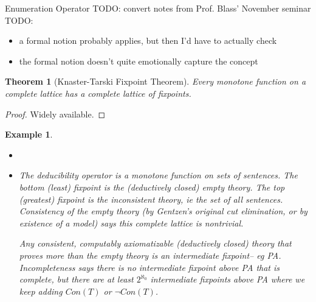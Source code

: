 \documentclass[
	fontsize=10pt, %
	twoside=false, %
	secnumdepth=-1, %
]{kaobook}
\theoremstyle{break}
\newtheorem*{thm}{Theorem} %
\newtheorem*{Ex}{Example} %
\begin{document}
    \See Enumeration Operator
    TODO: convert notes from Prof. Blass' November seminar
    TODO:
    \begin{itemize}
        \item a formal notion probably applies, but then I'd have to actually check
        \item the formal notion doesn't quite emotionally capture the concept
    \end{itemize}
    \begin{thm}[Knaster-Tarski Fixpoint Theorem]
        Every monotone function on a complete lattice has a complete lattice of fixpoints.
    \end{thm}
    \begin{proof}
        Widely available.
    \end{proof}
    \begin{Ex}
        \begin{itemize}
            \item[]
            \item The deducibility operator is a monotone function on sets of sentences.
                The bottom (least) fixpoint is the (deductively closed) empty theory.
                The top (greatest) fixpoint is the inconsistent theory, ie the set of all sentences.
                Consistency of the empty theory
                (by Gentzen's original cut elimination, or by existence of a model)
                says this complete lattice is nontrivial.

                Any consistent, computably axiomatizable (deductively closed) theory that proves more than the empty theory
                is an intermediate fixpoint-- eg PA.
                Incompleteness says there is no intermediate fixpoint above PA that is complete,
                but there are at least $2^{ℵ_0}$ intermediate fixpoints above PA where we keep adding $Con(T)$ or $¬Con(T)$.
        \end{itemize}
    \end{Ex}
\end{document}
